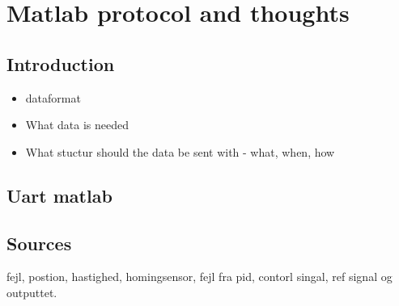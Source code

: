 \documentclass[../main]{subfiles}
\begin{document}
\section*{Matlab protocol and thoughts}

\subsection*{Introduction}


\begin{itemize}
  \item dataformat
  \item What data is needed
  \item What stuctur should the data be sent with - what, when, how
\end{itemize}

\subsection*{Uart matlab}



\subsection{Sources}

fejl, postion, hastighed, homingsensor, fejl fra pid, contorl singal, ref signal og outputtet.
\end{document}

